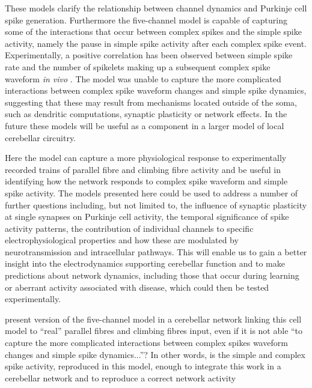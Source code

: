 \documentclass[utf8]{frontiersSCNS} %
\begin{document}
These models clarify the relationship between channel dynamics and Purkinje cell spike generation. Furthermore the five-channel model is capable of capturing some of the interactions that occur between complex spikes and the simple spike activity, namely the pause in simple spike activity after each complex spike event. Experimentally, a positive correlation has been observed between simple spike rate and the number of spikelets making up a subsequent
complex spike waveform \textit{in vivo} \cite{BurroughsEtAl2016}. The model was unable to capture the more complicated interactions between complex spike waveform changes and simple spike dynamics, suggesting that these may result from mechanisms located outside of the soma, such as dendritic computations, synaptic plasticity or network effects. In the future these models will be useful as a component in a larger model of local cerebellar circuitry.


Here the model can capture a more physiological response to experimentally recorded trains of parallel fibre and climbing fibre activity and be useful in identifying how the network responds to complex spike waveform and simple spike activity. The models presented here could be used to address a number of further questions including, but not limited to, the influence of synaptic plasticity at single synapses on Purkinje cell activity, the temporal significance of spike activity patterns, the contribution of individual channels to
specific electrophysiological properties and how these are modulated
by neurotransmission and intracellular pathways. This will enable us to gain a better insight into the electrodynamics supporting cerebellar function and to make predictions about network dynamics, including those that
occur during learning or aberrant activity associated with disease, which could then be tested experimentally.


present version of the five-channel
model in a cerebellar network linking this cell model to “real” parallel fibres and climbing fibres
input, even if it is not able “to capture the more complicated interactions between complex spikes
waveform changes and simple spike dynamics...”?
In other words, is the simple and complex spike activity, reproduced in this model, enough to
integrate this work in a cerebellar network and to reproduce a correct network activity



\end{document}

